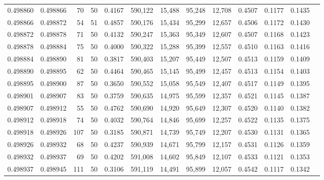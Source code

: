 \begin{tabular}{rrrrrrrrrrrrr}
0.498860 & 0.498866 &    70 &  50 &                                     0.4167 & 590,122 &  15,488 &  95,248 &  12,708 & 0.4507 & 0.1177 & 0.1435 \\
0.498866 & 0.498872 &    54 &  51 &                                     0.4857 & 590,176 &  15,434 &  95,299 &  12,657 & 0.4506 & 0.1172 & 0.1430 \\
0.498872 & 0.498878 &    71 &  50 &                                     0.4132 & 590,247 &  15,363 &  95,349 &  12,607 & 0.4507 & 0.1168 & 0.1423 \\
0.498878 & 0.498884 &    75 &  50 &                                     0.4000 & 590,322 &  15,288 &  95,399 &  12,557 & 0.4510 & 0.1163 & 0.1416 \\
0.498884 & 0.498890 &    81 &  50 &                                     0.3817 & 590,403 &  15,207 &  95,449 &  12,507 & 0.4513 & 0.1159 & 0.1409 \\
0.498890 & 0.498895 &    62 &  50 &                                     0.4464 & 590,465 &  15,145 &  95,499 &  12,457 & 0.4513 & 0.1154 & 0.1403 \\
0.498895 & 0.498900 &    87 &  50 &                                     0.3650 & 590,552 &  15,058 &  95,549 &  12,407 & 0.4517 & 0.1149 & 0.1395 \\
0.498901 & 0.498907 &    83 &  50 &                                     0.3759 & 590,635 &  14,975 &  95,599 &  12,357 & 0.4521 & 0.1145 & 0.1387 \\
0.498907 & 0.498912 &    55 &  50 &                                     0.4762 & 590,690 &  14,920 &  95,649 &  12,307 & 0.4520 & 0.1140 & 0.1382 \\
0.498912 & 0.498918 &    74 &  50 &                                     0.4032 & 590,764 &  14,846 &  95,699 &  12,257 & 0.4522 & 0.1135 & 0.1375 \\
0.498918 & 0.498926 &   107 &  50 &                                     0.3185 & 590,871 &  14,739 &  95,749 &  12,207 & 0.4530 & 0.1131 & 0.1365 \\
0.498926 & 0.498932 &    68 &  50 &                                     0.4237 & 590,939 &  14,671 &  95,799 &  12,157 & 0.4531 & 0.1126 & 0.1359 \\
0.498932 & 0.498937 &    69 &  50 &                                     0.4202 & 591,008 &  14,602 &  95,849 &  12,107 & 0.4533 & 0.1121 & 0.1353 \\
0.498937 & 0.498945 &   111 &  50 &                                     0.3106 & 591,119 &  14,491 &  95,899 &  12,057 & 0.4542 & 0.1117 & 0.1342 \\

\end{tabular}
